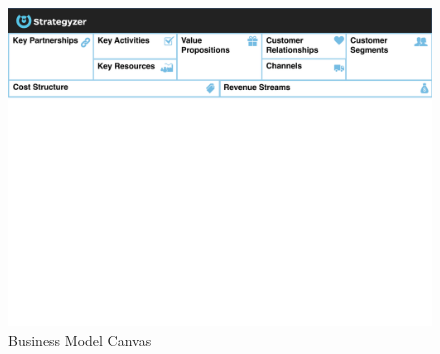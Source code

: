 		\begin{figure}[ht]
		    \begin{center}
			    \includegraphics[scale=0.6]{Talk11/bmc_blocks_only.pdf}
		    \end{center}
		    \caption{Business Model Canvas \cite{bmc}}
		    \label{fig:bmc}
		\end{figure}
